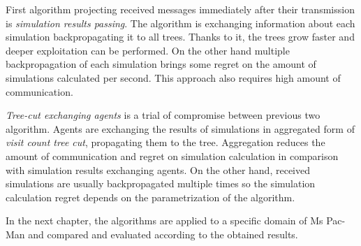 First algorithm projecting received messages immediately after their transmission is
\emph{simulation results passing}. The algorithm is exchanging information about each
simulation backpropagating it to all trees. Thanks to it, the trees grow faster and deeper
exploitation can be performed. On the other hand multiple backpropagation of each simulation
brings some regret on the amount of simulations calculated per second. This approach also
requires high amount of communication.

\emph{Tree-cut exchanging agents} is a trial of compromise between previous two algorithm.
Agents are exchanging the results of simulations in aggregated form of \emph{visit count tree
cut}, propagating them to the tree. Aggregation reduces the amount of communication and regret
on simulation calculation in comparison with simulation results exchanging agents. On the other
hand, received simulations are usually backpropagated multiple times so the simulation
calculation regret depends on the parametrization of the algorithm.

In the next chapter, the algorithms are applied to a specific domain of Ms Pac-Man and compared
and evaluated according to the obtained results.
